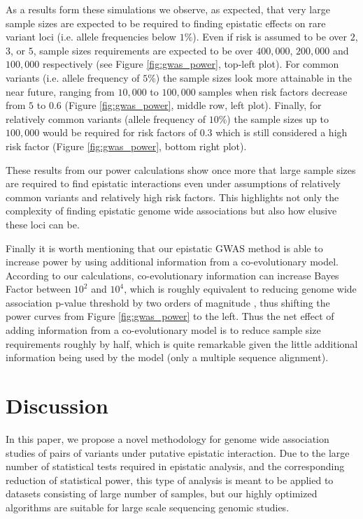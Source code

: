 As a results form these simulations we observe, as expected, that very large sample sizes are expected to be required to finding epistatic effects on rare variant loci (i.e. allele frequencies below $1\%$).
Even if risk is assumed to be over $2$, $3$, or $5$, sample sizes requirements are expected to be over $400,000$, $200,000$ and $100,000$ respectively (see Figure \ref{fig:gwas_power}, top-left plot).
For common variants (i.e. allele frequency of $5\%$) the sample sizes look more attainable in the near future, ranging from $10,000$ to $100,000$ samples when risk factors decrease from $5$ to $0.6$ (Figure \ref{fig:gwas_power}, middle row, left plot).
Finally, for relatively common variants (allele frequency of $10\%$) the sample sizes up to $100,000$ would be required for risk factors of $0.3$ which is still considered a high risk factor (Figure \ref{fig:gwas_power}, bottom right plot).

These results from our power calculations show once more that large sample sizes are required to find epistatic interactions even under assumptions of relatively common variants and relatively high risk factors.
This highlights not only the complexity of finding epistatic genome wide associations but also how elusive these loci can be.

Finally it is worth mentioning that our epistatic GWAS method is able to increase power by using additional information from a co-evolutionary model.
According to our calculations, co-evolutionary information can increase Bayes Factor between $10^2$ and $10^4$, which is roughly equivalent to reducing genome wide association p-value threshold by two orders of magnitude \cite{goodman1999toward}, thus shifting the power curves from Figure \ref{fig:gwas_power} to the left.
Thus the net effect of adding information from a co-evolutionary model is to reduce sample size requirements roughly by half, which is quite remarkable given the little additional information being used by the model (only a multiple sequence alignment).

\section{Discussion}

In this paper, we propose a novel methodology for genome wide association studies of pairs of variants under putative epistatic interaction. Due to the large number of statistical tests required in epistatic analysis, and the corresponding reduction of statistical power, this type of analysis is meant to be applied to datasets consisting of large number of samples, but our highly optimized algorithms are suitable for large scale sequencing genomic studies.

